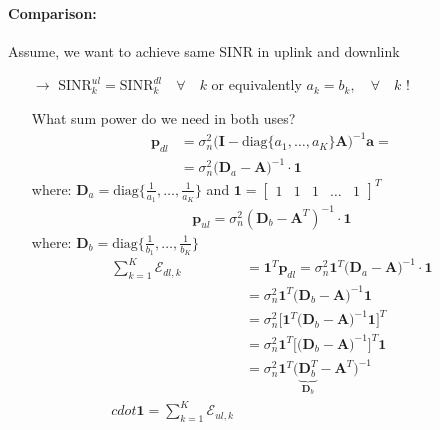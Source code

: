 \documentclass[a4paper, 10pt]{article}
\begin{document}
\paragraph{Comparison:} Assume, we want to achieve same SINR in uplink and downlink
\begin{itemize}
	\item[$\rightarrow$] $\text{SINR}_k^{ul}  = \text{SINR}_k^{dl} \quad \forall\quad k $ or equivalently $ a_k = b_k,\quad \forall\quad k $ !
	\item[] What sum power do we need in both uses?
	\begin{align*}
		\mathbf{p}_{dl} &= \sigma_n^2\bigl(\mathbf{I} - \text{diag}\{a_1, \ldots, a_K\}\mathbf{A}\bigr)^{-1}\mathbf{a} = \\
		&= \sigma_n^2\bigl(\mathbf{D}_a - \mathbf{A}\bigr)^{-1}\cdot\mathbf{1}
	\end{align*}
	where: $\mathbf{D}_a = \text{diag}\{\frac{1}{a_1}, \ldots, \frac{1}{a_K}\} $ and $ \mathbf{1} = \begin{bmatrix}	1 & 1 & 1 & \ldots & 1 \end{bmatrix}^T $ 
	\begin{align*}
		\mathbf{p}_{ul} = \sigma_n^2(\mathbf{D}_b - \mathbf{A}^T)^{-1}\cdot \mathbf{1}
	\end{align*}
	where: $\mathbf{D}_b = \text{diag}\{\frac{1}{b_1}, \ldots ,\frac{1}{b_K}\} $
	\begin{align*}
		\sum\limits_{k = 1}^{K}\mathcal{E}_{dl,k} &= \mathbf{1}^T\mathbf{p}_{dl} = \sigma_n^2\mathbf{1}^T\bigl(\mathbf{D}_a - \mathbf{A}\bigr)^{-1}\cdot\mathbf{1}\\
		&= \sigma_n^2\mathbf{1}^T\bigl(\mathbf{D}_b - \mathbf{A}\bigr)^{-1}\mathbf{1} \\
		&= \sigma_n^2\bigl[\mathbf{1}^T\bigl(\mathbf{D}_b - \mathbf{A}\bigr)^{-1}\mathbf{1}\bigr]^T \\
		&= \sigma_n^2\mathbf{1}^T\bigl[\bigl(\mathbf{D}_b - \mathbf{A}\bigr)^{-1}\bigr]^T\mathbf{1} \\
		&= \sigma_n^2\mathbf{1}^T\bigl(\underbrace{\mathbf{D}_b^T}_{\mathbf{D}_b} - \mathbf{A}^T\bigr)^{-1}\\cdot\mathbf{1} = \sum\limits_{k = 1}^{K}\mathcal{E}_{ul,k}
	\end{align*}
\end{itemize}
\end{document}
